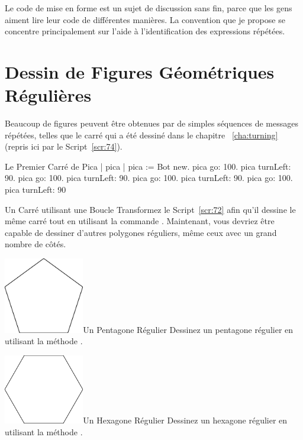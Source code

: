 \documentclass[a4paper,10pt,twoside]{book}
\begin{document}
Le code de mise en forme est un sujet de discussion sans fin, parce que les gens aiment 
lire leur code de différentes manières. La convention que je propose se concentre 
principalement sur  l'aide à l'identification des expressions répétées.
 
\section{Dessin de Figures Géométriques Régulières} 

Beaucoup de figures peuvent être obtenues par de simples séquences de messages répétées, 
telles que le carré qui a été dessiné dans le chapitre ~\ref{cha:turning} (repris ici par le Script~\ref{scr:74}). 

\begin{script}[74]{Le Premier Carré de Pica}
| pica | 
pica := Bot new. 
pica go: 100. 
pica turnLeft: 90. 
pica go: 100. 
pica turnLeft: 90. 
pica go: 100. 
pica turnLeft: 90. 
pica go: 100. 
pica turnLeft: 90
\end{script}


\begin{exonofigtitle}{Un Carré utilisant une Boucle}
Transformez le Script~\ref{scr:72} afin qu’il dessine le même carré tout en utilisant la 
commande . Maintenant, vous devriez être capable de dessiner d'autres 
polygones réguliers, même ceux avec un grand nombre de côtés.
\end{exonofigtitle}


\begin{exofigwithsizeandtitle}[0.65]{\includegraphics[width=3.5cm]{loopPentagon}}{Un Pentagone Régulier}\label{xp:73}
Dessinez un pentagone régulier en utilisant la méthode . 
\end{exofigwithsizeandtitle}


\begin{exofigwithsizeandtitle}[0.65]{\includegraphics[width=3.5cm]{loopHexagon}}{Un Hexagone Régulier}\label{xp:74}
Dessinez un hexagone régulier en utilisant la méthode .
\end{exofigwithsizeandtitle}
\end{document}
